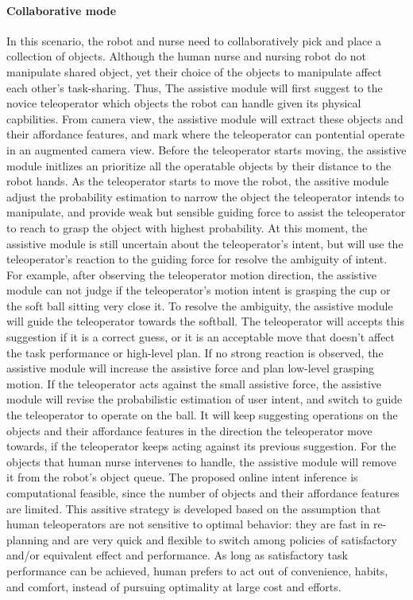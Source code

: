 \documentclass[letterpaper, 11 pt, onecolumn]{article}
\begin{document}
\paragraph*{Collaborative mode} In this scenario, the robot and nurse need to collaboratively pick and place a collection of objects. Although the human nurse and nursing robot do not manipulate shared object, yet their choice of the objects to manipulate affect each other's task-sharing. Thus, The assistive module will first suggest to the novice teleoperator which objects the robot can handle given its physical capbilities. From camera view, the assistive module will extract these objects and their affordance features, and mark where the teleoperator can pontential operate in an augmented camera view. Before the teleoperator starts moving, the assistive module initlizes an prioritize all the operatable objects by their distance to the robot hands. As the teleoperator starts to move the robot, the assitive module adjust the probability estimation to narrow the object the teleoperator intends to manipulate, and provide weak but sensible guiding force to assist the teleoperator to reach to grasp the object with highest probability. At this moment, the assistive module is still uncertain about the teleoperator's intent, but will use the teleoperator's reaction to the guiding force for resolve the ambiguity of intent. For example, after observing the teleoperator motion direction, the assistive module can not judge if the teleoperator's motion intent is grasping the cup or the soft ball sitting very close it. To resolve the ambiguity, the assistive module will guide the teleoperator towards the softball. The teleoperator will accepts this suggestion if it is a correct guess, or it is an acceptable move that doesn't affect the task performance or high-level plan. If no strong reaction is observed, the assistive module will increase the assistive force and plan low-level grasping motion. If the teleoperator acts against the small assistive force, the assistive module will revise the probabilistic estimation of user intent, and switch to guide the teleoperator to operate on the ball. It will keep suggesting operations on the objects and their affordance features in the direction the teleoperator move towards, if the teleoperator keeps acting against its previous suggestion. For the objects that human nurse intervenes to handle, the assistive module will remove it from the robot's object queue. The proposed online intent inference is computational feasible, since the number of objects and their affordance features are limited. This assitive strategy is developed based on the assumption that human teleoperators are not sensitive to optimal behavior: they are fast in re-planning and are very quick and flexible to switch among policies of satisfactory and/or equivalent effect and performance. As long as satisfactory task performance can be achieved, human prefers to act out of convenience, habits, and comfort, instead of pursuing optimality at large cost and efforts. 
\end{document}
